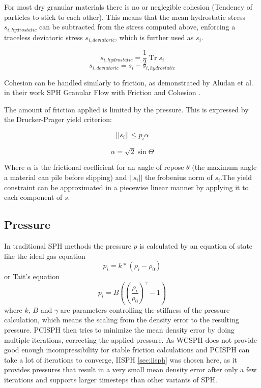 \documentclass[intern]{cgMA}
\DeclareMathOperator{\Tr}{Tr}
\begin{document}
    For most dry granular materials there is no or neglegible cohesion (Tendency of particles to stick to each other). This means that the mean hydrostatic stress $s_{i, hydrostatic}$ can be subtracted from the stress computed above, enforcing a traceless deviatoric stress $s_{i, deviatoric}$, which is further used as $s_i$. 

    \begin{equation}
        s_{i, hydrostatic} = \frac{1}{2} \Tr s_i 
    \end{equation}
    \begin{equation}
        s_{i, deviatoric} = s_i - s_{i, hydrostatic} 
    \end{equation}

    Cohesion can be handled similarly to friction, as demonstrated by Aludan et al. in their work SPH Granular Flow with Friction and Cohesion \cite{10.1145/2019406.2019410}.

    The amount of friction applied is limited by the pressure. This is expressed by the Drucker-Prager yield criterion:

    \begin{equation}
        ||s_i|| \leq p_i \alpha
    \end{equation}

    \begin{equation}
        \alpha = \sqrt{2} \sin \Theta
    \end{equation}

    Where $\alpha$ is the frictional coefficient for an angle of repose $\theta$ (the maximum angle a material can pile before slipping) and $||s_i||$ the frobenius norm of $s_i$.The yield constraint can be approximated in a piecewise linear manner by applying it to each component of $s$. \cite{10.1145/2019406.2019410} \cite{10.2312:PE:vriphys:vriphys12:053-060} \cite{10.2312:LocalChapterEvents:CEIG:CEIG09:011-018} \cite{10.1145/1866158.1866195}

    \subsection{Pressure} \label{sec:pressure}
    In traditional SPH methods the pressure $p$ is calculated by an equation of state like the ideal gas equation \cite{wcsph}
    \begin{equation}
        p_i = k * (\rho_i - \rho_0)
    \end{equation}
    or Tait's equation \cite{wcsph}
    \begin{equation}
        p_i = B ((\frac{\rho_i}{\rho_0})^{\gamma} - 1)
    \end{equation}
    where $k$, $B$ and $\gamma$ are parameters controlling the stiffness of the pressure calculation, which means the scaling from the density error to the resulting pressure.
    PCISPH then tries to minimize the mean density error by doing multiple iterations, correcting the applied pressure. As WCSPH does not provide good enough incompressibility for stable friction calculations and PCISPH can take a lot of iterations to converge, IISPH \ref{sec:iisph} was chosen here, as it provides pressures that result in a very small mean density error after only a few iterations and supports larger timesteps than other variants of SPH.
\end{document}
